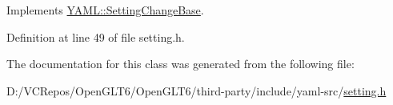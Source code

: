 Implements \mbox{\hyperlink{class_y_a_m_l_1_1_setting_change_base_a189c55070d4636271b3504aacd097e8c}{Y\+A\+M\+L\+::\+Setting\+Change\+Base}}.



Definition at line 49 of file setting.\+h.



The documentation for this class was generated from the following file\+:\begin{DoxyCompactItemize}
\item 
D\+:/\+V\+C\+Repos/\+Open\+G\+L\+T6/\+Open\+G\+L\+T6/third-\/party/include/yaml-\/src/\mbox{\hyperlink{setting_8h}{setting.\+h}}\end{DoxyCompactItemize}
